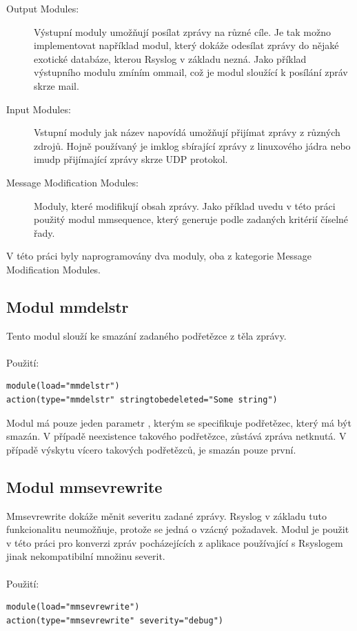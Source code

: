 \documentclass[thesis=B,czech]{FITthesis}[2012/06/26]
\begin{document}
\begin{description}
  \item [Output Modules:] Výstupní moduly umožňují posílat zprávy na různé cíle. Je tak možno implementovat například modul, který dokáže odesílat zprávy do nějaké exotické databáze, kterou Rsyslog v základu nezná. Jako příklad výstupního modulu zmíním ommail, což je modul sloužící k posílání zpráv skrze mail.
  \item [Input Modules:] Vstupní moduly jak název napovídá umožňují přijímat zprávy z různých zdrojů. Hojně používaný je imklog sbírající zprávy z linuxového jádra nebo imudp přijímající zprávy skrze UDP protokol.
  \item [Message Modification Modules:] Moduly, které modifikují obsah zprávy. Jako příklad uvedu v této práci použitý modul mmsequence, který generuje podle zadaných kritérií číselné řady.
\end{description}


V této práci byly naprogramovány dva moduly, oba z kategorie Message Modification Modules.

\subsection{Modul mmdelstr}
Tento modul slouží ke smazání zadaného podřetězce z těla zprávy.
\\
\\
Použití:
\begin{lstlisting}[style=RainerScriptSimpleStyle]
module(load="mmdelstr") 
action(type="mmdelstr" stringtobedeleted="Some string")
\end{lstlisting}

Modul má pouze jeden parametr , kterým se specifikuje podřetězec, který má být smazán. V případě neexistence takového podřetězce, zůstává zpráva netknutá. V případě výskytu vícero takových podřetězců, je smazán pouze první.

\subsection{Modul mmsevrewrite}
Mmsevrewrite dokáže měnit severitu zadané zprávy. Rsyslog v základu tuto funkcionalitu neumožňuje, protože se jedná o vzácný požadavek. Modul je použit v této práci pro konverzi zpráv pocházejících z aplikace používající s Rsyslogem jinak nekompatibilní množinu severit.
\\
\\
Použití:
\begin{lstlisting}[style=RainerScriptSimpleStyle]
module(load="mmsevrewrite")
action(type="mmsevrewrite" severity="debug")
\end{lstlisting}
\end{document}
